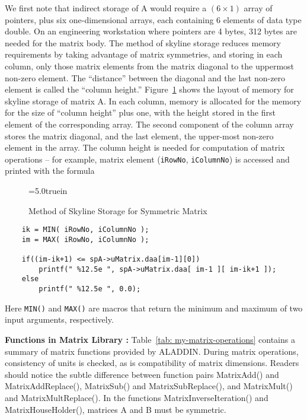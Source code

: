 \vspace{0.15 in}\noindent
We first note that indirect storage of A would require a $(6 \times 1)$ array
of pointers, plus six one-dimensional arrays,
each containing 6 elements of data type double.
On an engineering workstation where pointers are 4 bytes, 
312 bytes are needed for the matrix body.
The method of skyline storage reduces memory requirements
by taking advantage of matrix symmetries,
and storing in each column, only those matrix
elements from the matrix diagonal to the uppermost non-zero element.
The ``distance'' between the diagonal and the
last non-zero element is called the ``column height.'' 
Figure~\ref{fig: Matrix_Skyline} shows the layout of
memory for skyline storage of matrix A.
In each column, memory is allocated for the 
memory for the size of ``column height'' plus one,
with the height stored in the first element of the corresponding array.
The second component of the column array stores the matrix diagonal,
and the last element, the upper-most non-zero element in the array.
The column height is needed for computation of matrix operations --
for example, matrix element ({\tt iRowNo}, {\tt iColumnNo}) is
accessed and printed with the formula

\begin{figure}[t]
\epsfxsize=5.0truein
\centerline{}
\caption{Method of Skyline Storage for Symmetric Matrix}
\label{fig: Matrix_Skyline}
\end{figure}

\begin{footnotesize}
\begin{verbatim}
    ik = MIN( iRowNo, iColumnNo );
    im = MAX( iRowNo, iColumnNo );

    if((im-ik+1) <= spA->uMatrix.daa[im-1][0])
        printf(" %12.5e ", spA->uMatrix.daa[ im-1 ][ im-ik+1 ]);
    else
        printf(" %12.5e ", 0.0);
\end{verbatim}
\end{footnotesize}

\vspace{0.15 in}\noindent
Here {\tt MIN()} and {\tt MAX()} are macros that return the
minimum and maximum of two input arguments, respectively.

\vspace{0.15 in}\noindent
{\bf Functions in Matrix Library :}
Table~\ref{tab: my-matrix-operations} contains a
summary of matrix functions provided by ALADDIN.
During matrix operations, consistency of units is checked,
as is compatibility of matrix dimensions.
Readers should notice the subtle difference between function pairs
MatrixAdd() and MatrixAddReplace(),
MatrixSub() and MatrixSubReplace(), and
MatrixMult() and MatrixMultReplace().
In the functions MatrixInverseIteration() and MatrixHouseHolder(),
matrices A and B must be symmetric.

